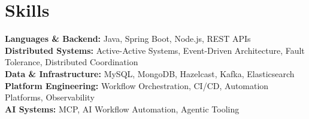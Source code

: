 \section*{Skills}

\textbf{Languages \& Backend:}
Java, Spring Boot, Node.js, REST APIs \\

\textbf{Distributed Systems:}
Active-Active Systems, Event-Driven Architecture, Fault Tolerance, Distributed Coordination \\

\textbf{Data \& Infrastructure:}
MySQL, MongoDB, Hazelcast, Kafka, Elasticsearch \\

\textbf{Platform Engineering:}
Workflow Orchestration, CI/CD, Automation Platforms, Observability \\

\textbf{AI Systems:}
MCP, AI Workflow Automation, Agentic Tooling
